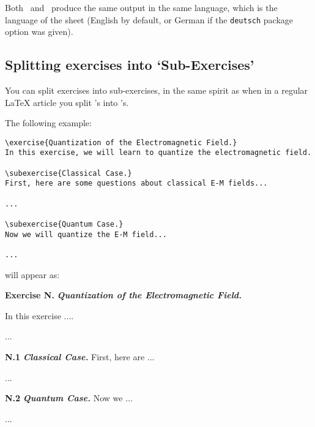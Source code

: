 \documentclass[11pt,a4paper]{article}
\begin{document}


\begin{pkgnotice}
  Both~ and~ produce the same output in the same
  language, which is the language of the sheet (English by default, or German if the
  \texttt{deutsch} package option was given).
\end{pkgnotice}


\subsection{Splitting exercises into `Sub-Exercises'}
\label{sec:subexercises}

You can split exercises into sub-exercises, in the same spirit as when in a regular
\LaTeX{} article you split 's into 's.




The following example:
\begin{pkgverbatim}
\begin{verbatim}
\exercise{Quantization of the Electromagnetic Field.}
In this exercise, we will learn to quantize the electromagnetic field.

\subexercise{Classical Case.}
First, here are some questions about classical E-M fields...

...

\subexercise{Quantum Case.}
Now we will quantize the E-M field...

...

\end{verbatim}
\end{pkgverbatim}
will appear as:
\begin{pkgverbatim}[0mm]
  {\bf Exercise N.} \hspace*{2mm} {\em\bfseries Quantization of the Electromagnetic Field.}

  In this exercise ....

  ...

  {\bf N.1}\hspace*{1mm} {\em\bfseries Classical Case.}\hspace*{3mm} First, here are ...

  ...

  {\bf N.2}\hspace*{1mm} {\em\bfseries Quantum Case.}\hspace*{3mm} Now we ...

  ...
  
\end{pkgverbatim}
\end{document}
